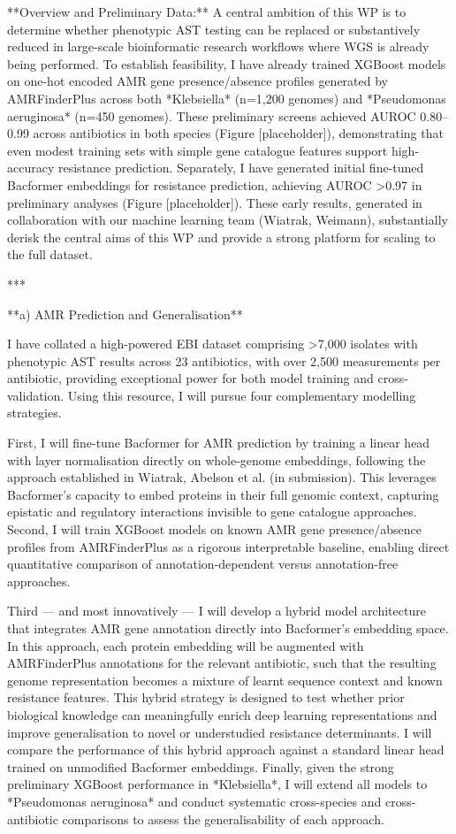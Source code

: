 \documentclass{article}
\begin{document}
**Overview and Preliminary Data:**
A central ambition of this WP is to determine whether phenotypic AST testing can be replaced or substantively reduced in large-scale bioinformatic research workflows where WGS is already being performed. To establish feasibility, I have already trained XGBoost models on one-hot encoded AMR gene presence/absence profiles generated by AMRFinderPlus across both *Klebsiella* (n=1,200 genomes) and *Pseudomonas aeruginosa* (n=450 genomes). These preliminary screens achieved AUROC 0.80–0.99 across antibiotics in both species (Figure [placeholder]), demonstrating that even modest training sets with simple gene catalogue features support high-accuracy resistance prediction. Separately, I have generated initial fine-tuned Bacformer embeddings for resistance prediction, achieving AUROC >0.97 in preliminary analyses (Figure [placeholder]). These early results, generated in collaboration with our machine learning team (Wiatrak, Weimann), substantially derisk the central aims of this WP and provide a strong platform for scaling to the full dataset.

***

**a) AMR Prediction and Generalisation**

I have collated a high-powered EBI dataset comprising >7,000 isolates with phenotypic AST results across 23 antibiotics, with over 2,500 measurements per antibiotic, providing exceptional power for both model training and cross-validation. Using this resource, I will pursue four complementary modelling strategies.

First, I will fine-tune Bacformer for AMR prediction by training a linear head with layer normalisation directly on whole-genome embeddings, following the approach established in Wiatrak, Abelson et al. (in submission). This leverages Bacformer's capacity to embed proteins in their full genomic context, capturing epistatic and regulatory interactions invisible to gene catalogue approaches. Second, I will train XGBoost models on known AMR gene presence/absence profiles from AMRFinderPlus as a rigorous interpretable baseline, enabling direct quantitative comparison of annotation-dependent versus annotation-free approaches.

Third — and most innovatively — I will develop a hybrid model architecture that integrates AMR gene annotation directly into Bacformer's embedding space. In this approach, each protein embedding will be augmented with AMRFinderPlus annotations for the relevant antibiotic, such that the resulting genome representation becomes a mixture of learnt sequence context and known resistance features. This hybrid strategy is designed to test whether prior biological knowledge can meaningfully enrich deep learning representations and improve generalisation to novel or understudied resistance determinants. I will compare the performance of this hybrid approach against a standard linear head trained on unmodified Bacformer embeddings. Finally, given the strong preliminary XGBoost performance in *Klebsiella*, I will extend all models to *Pseudomonas aeruginosa* and conduct systematic cross-species and cross-antibiotic comparisons to assess the generalisability of each approach.
\end{document}
